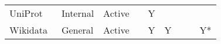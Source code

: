 \begin{table}
\begin{tabular}{lllllllll}
             UniProt~\cite{Bateman2021} &        Internal &       Active &                           &                      Y &                                &                        &                      &                        \\
        Wikidata~\cite{Waagmeester2020} &         General &       Active &                           &                      Y &                              Y &                        &                      &                     Y* \\
\bottomrule
\end{tabular}
\end{table}
